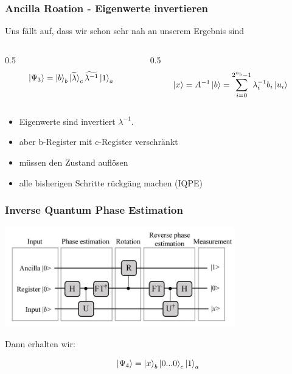 \begin{frame}
    \frametitle{Ancilla Roation - Eigenwerte invertieren}

    Uns fällt auf, dass wir schon sehr nah an unserem Ergebnis sind
    \begin{columns}[c]
        \begin{column}{0.5\hsize}\centering
        $$\ket{\Psi_3} = \ket{b}_b \ket{\widetilde{\lambda}}_c \widetilde{\lambda^{-1}} \ket{1}_a$$
        \end{column}
        \begin{column}{0.5\hsize}
        $$\ket{x} =  A^{-1} \ket{b} = \sum_{i=0}^{2^{n_b}-1} \lambda_i^{-1} b_i\ket{u_i}$$
        \end{column}
    \end{columns}

    \hfil

    \hfil

    \begin{itemize}
        \item Eigenwerte sind invertiert $\lambda^{-1}$.
        \item aber b-Register mit c-Register verschränkt
        \item müssen den Zustand auflösen 
        \item alle bisherigen Schritte rückgäng machen (IQPE)
    \end{itemize}



\end{frame}


\begin{frame}

    \frametitle{Inverse Quantum Phase Estimation}
    \begin{center}
    \includegraphics[width=10cm]{img/hhl_circuit.jpg}
    \end{center}

    Dann erhalten wir:

    $$\ket{\Psi_4} = \ket{x}_b \ket{0...0}_c\ket{1}_a$$


\end{frame}


